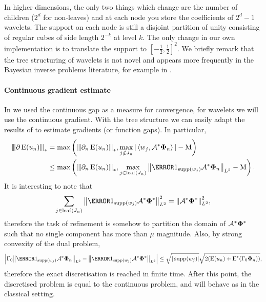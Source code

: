 \documentclass[10pt,a4paper,onecolumn]{article}
\numberwithin{equation}{section}
\newcommand{\Norm}[1]{{\left\vert\kern-0.25ex\left\vert\kern-0.25ex\left\vert #1 \right\vert\kern-0.25ex\right\vert\kern-0.25ex\right\vert}}
\newcommand{\norm}[1]{{\left\lVert #1 \right\rVert}}
\newcommand{\IP}[2]{\left\langle #1,#2 \right\rangle}\newcommand{\ip}[2]{#1 \vcenter{\hbox{\resizebox{6pt}{!}{\ensuremath\cdot}}} #2}
\newcommand{\op}[1]{\operatorname{#1}}\newcommand{\overtext}[2]{\stackrel{\text{#1}}{#2}}
\renewcommand{\vec}{\mathbf}
\newcommand*{\Func}[1]{%
	\IfEqCase{#1}{%
		{0}{\op{E}}%
		{1}{\op{F}}%
		{2}{\op{G}}%
		{3}{\op{H}}%
	}[\op{F}#1]%
}
\newcommand*{\varf}[1]{%
	\IfEqCase{#1}{%
		{0}{u}%
		{1}{v}%
		{2}{w}%
	}[u#1]%
}
\newcommand*{\vard}[1]{%
	\IfEqCase{#1}{%
		{0}{\varphi}%
		{1}{\psi}%
	}[\varphi #1]%
}
\newcommand*{\vars}[1]{%
	\IfEqCase{#1}{%
		{0}{\alpha}%
		{1}{\beta}%
		{2}{\gamma}%
		{3}{a}%
		{4}{b}%
		{5}{c}%
	}[k#1]%
}
\newcommand*{\data}[1]{%
	\IfEqCase{#1}{%
		{0}{\eta}%
		{1}{\nu}%
	}[g]%
}
\newcommand*{\vvard}[1]{\vec{\vard{#1}}}\newcommand*{\vdata}[1]{\vec{\data{#1}}}
\begin{document}
In higher dimensions, the only two things which change are the number of children ($2^d$ for non-leaves) and at each node you store the coefficients of $2^d-1$ wavelets. The support on each node is still a disjoint partition of unity consisting of regular cubes of side length $2^{-k}$ at level $k$. The only change in our own implementation is to translate the support to $[-\tfrac12,\tfrac12]^2$. We briefly remark that the tree structuring of wavelets is not novel and appears more frequently in the Bayesian inverse problems literature, for example in \cite{Castillo2019}.

\paragraph{Continuous gradient estimate}
In  we used the continuous gap as a measure for convergence, for wavelets we will use the continuous gradient. With the tree structure we can easily adapt the results of  to estimate gradients (or function gaps). In particular,
\begin{align}
	\Norm{\partial \Func0(\varf0_n)}_* &=\max\left(\Norm{\partial_n\Func0(\varf0_n)}_*, \max_{j\notin J_n} |\IP{w_j}{\A^*\vvard0_n}| -\mu \right) \\&\leq\max\left(\Norm{\partial_n\Func0(\varf0_n)}_*, \max_{j\in \op{leaf}(J_n)} \norm{\1_{\supp(w_j)}\A^*\vvard0_n}_{L^2} -\mu \right).\label{eq:ca: wavelet error metric}
\end{align}
It is interesting to note that 
$$\sum_{j\in\op{leaf}(J_n)} \norm{\1_{\supp(w_j)}\A^*\vvard0^*}_{L^2}^2 = \norm{\A^*\vvard0^*}_{L^2}^2,$$
therefore the task of refinement is somehow to partition the domain of $\A^*\vvard0^*$ such that no single component has more than $\mu$ magnitude. Also, by strong convexity of the dual problem,
$$\left|\vars2_0\norm{\1_{\supp(w_j)}\A^*\vvard0_n}_{L^2} - \norm{\1_{\supp(w_j)}\A^*\vvard0^*}_{L^2}\right| \leq \sqrt{|\supp(w_j)|}\sqrt{2(\Func0(\varf0_n)+\Func0^*(\vars2_0\vvard0_n))},$$
therefore the exact discretisation is reached in finite time. After this point, the discretised problem is equal to the continuous problem, and  will behave as in the classical setting.
\end{document}
